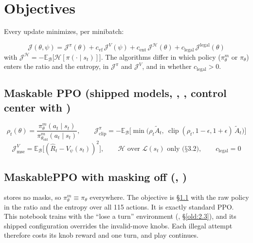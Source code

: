 \section{Objectives}\label{old:5}

Every update minimizes, per minibatch:

\[
\mathcal{J}(\theta, \psi) = \mathcal{J}^{\pi}(\theta) + c_{\text{vf}}\,\mathcal{J}^{V}(\psi) + c_{\text{ent}}\,\mathcal{J}^{\mathcal{H}}(\theta) + c_{\text{legal}}\,\mathcal{J}^{\text{legal}}(\theta)
\]
with $\mathcal{J}^{\mathcal{H}} = -\mathbb{E}_{\mathcal{B}}\big[\mathcal{H}[\pi(\cdot \mid s_t)]\big]$. The algorithms differ in which policy ($\pi^m_\theta$ or $\pi_\theta$) enters the ratio and the entropy, in $\mathcal{J}^\pi$ and $\mathcal{J}^V$, and in whether $c_{\text{legal}} > 0$.

\subsection{Maskable PPO (shipped models, , , control center with )}\label{old:5.1}

\[
\rho_t(\theta) = \frac{\pi^m_\theta(a_t \mid s_t)}{\pi^m_{\theta_{\text{old}}}(a_t \mid s_t)},
\qquad
\mathcal{J}^{\pi}_{\text{clip}} = -\mathbb{E}_{\mathcal{B}}\Big[\min\big(\rho_t \tilde A_t,\ \operatorname{clip}(\rho_t, 1-\epsilon, 1+\epsilon)\,\tilde A_t\big)\Big]
\]
\[
\mathcal{J}^{V}_{\text{mse}} = \mathbb{E}_{\mathcal{B}}\big[(\hat R_t - V_\psi(s_t))^2\big],
\qquad
\mathcal{H} \text{ over } \mathcal{L}(s_t) \text{ only (§3.2)},
\qquad
c_{\text{legal}} = 0
\]
\subsection{MaskablePPO with masking off (, )}\label{old:5.2}

 stores no masks, so $\pi^m_\theta \equiv \pi_\theta$ everywhere. The objective is \S\ref{old:5.1} with the raw policy in the ratio and the entropy over all 115 actions. It is exactly standard PPO. This notebook trains with the ``lose a turn'' environment (, \S\ref{old:2.3}), and its shipped configuration overrides the invalid-move knobs. Each illegal attempt therefore costs its knob reward and one turn, and play continues.

